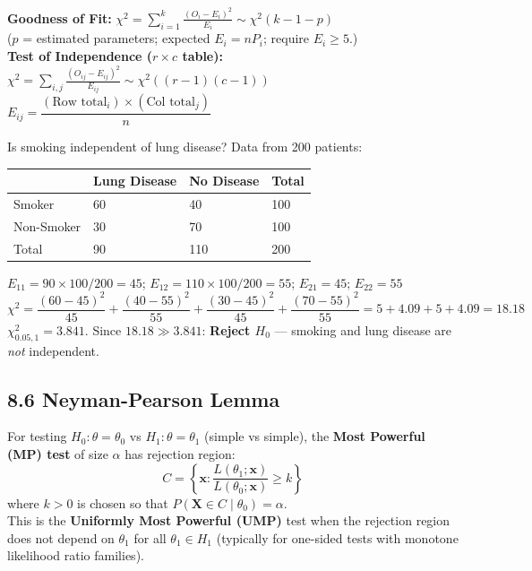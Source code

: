 \documentclass[12pt]{article}
\newcommand{\hcell}[1]{\textbf{\color{white}#1}}
\begin{document}
\begin{formulabox}
\textbf{Goodness of Fit:} $\chi^2=\displaystyle\sum_{i=1}^k\frac{(O_i-E_i)^2}{E_i}\sim\chi^2(k-1-p)$\\
($p$ = estimated parameters; expected $E_i=nP_i$; require $E_i\geq5$.)\\[8pt]
\textbf{Test of Independence ($r\times c$ table):} $\chi^2=\displaystyle\sum_{i,j}\frac{(O_{ij}-E_{ij})^2}{E_{ij}}\sim\chi^2((r-1)(c-1))$\\
$E_{ij}=\dfrac{(\text{Row total}_i)\times(\text{Col total}_j)}{n}$
\end{formulabox}

\begin{examplebox}
Is smoking independent of lung disease? Data from 200 patients:
\begin{center}{\small
\begin{tabular}{|l|C{2.5cm}|C{2.5cm}|C{1.8cm}|}
\hline{}\hcell{}&\hcell{Lung Disease}&\hcell{No Disease}&\hcell{Total}\\\hline
Smoker&60&40&100\\\hline
Non-Smoker&30&70&100\\\hline
Total&90&110&200\\\hline
\end{tabular}}
\end{center}
$E_{11}=90\times100/200=45$;\; $E_{12}=110\times100/200=55$;\; $E_{21}=45$;\; $E_{22}=55$\\[4pt]
$\chi^2=\dfrac{(60-45)^2}{45}+\dfrac{(40-55)^2}{55}+\dfrac{(30-45)^2}{45}+\dfrac{(70-55)^2}{55}=5+4.09+5+4.09=18.18$\\[4pt]
$\chi^2_{0.05,1}=3.841$. Since $18.18\gg3.841$: \textbf{Reject $H_0$} --- smoking and lung disease are \textit{not} independent.
\end{examplebox}

\subsection{8.6 Neyman-Pearson Lemma}

\begin{thmbox}
For testing $H_0:\theta=\theta_0$ vs $H_1:\theta=\theta_1$ (simple vs simple), the \textbf{Most Powerful (MP) test} of size $\alpha$ has rejection region:
\[C=\left\{\mathbf x:\frac{L(\theta_1;\mathbf x)}{L(\theta_0;\mathbf x)}\geq k\right\}\]
where $k>0$ is chosen so that $P(\mathbf X\in C\mid\theta_0)=\alpha$.\\[4pt]
This is the \textbf{Uniformly Most Powerful (UMP)} test when the rejection region does not depend on $\theta_1$ for all $\theta_1\in H_1$ (typically for one-sided tests with monotone likelihood ratio families).
\end{thmbox}
\end{document}
